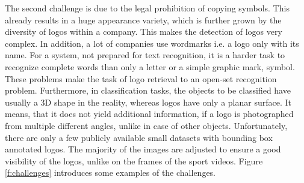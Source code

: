The second challenge is due to the legal prohibition of copying symbols. This already results in a huge appearance variety, which is further grown by the diversity of logos within a company. This makes the detection of logos very complex. In addition, a lot of companies use wordmarks i.e. a logo only with its name. For a system, not prepared for text recognition, it is a harder task to recognize complete words than only a letter or a simple graphic mark, symbol. These problems make the task of logo retrieval to an open-set recognition problem.
Furthermore, in classification tasks, the objects to be classified have usually a 3D shape in the reality, whereas logos have only a planar surface. It means, that it does not yield additional information, if a logo is photographed from multiple different angles, unlike in case of other objects.
Unfortunately, there are only a few publicly available small datasets with bounding box annotated logos. The majority of the images are adjusted to ensure a good visibility of the logos, unlike on the frames of the sport videos.
Figure \ref{f:challenges} introduces some examples of the challenges.
